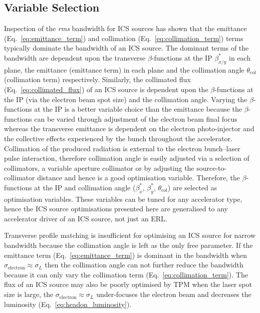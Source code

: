 \documentclass[../main.tex]{subfiles}
\begin{document}
\subsection{Variable Selection}
\label{sec:variable_selection}

Inspection of the \textit{rms} bandwidth for ICS sources has shown that the emittance (Eq.~\ref{eq:emittance_term}) and collimation (Eq.~\ref{eq:collimation_term}) terms typically dominate the bandwidth of an ICS source. The dominant terms of the bandwidth are dependent upon the transverse $\beta$-functions at the IP $\beta^{*}_{x/y}$ in each plane, the emittance (emittance term) in each plane and the collimation angle $\theta_{\mathrm{col}}$ (collimation term) respectively. Similarly, the collimated flux (Eq.~\ref{eq:collimated_flux}) of an ICS source is dependent upon the $\beta$-functions at the IP (via the electron beam spot size) and the collimation angle. Varying the $\beta$-functions at the IP is a better variable choice than the emittance because the $\beta$-functions can be varied through adjustment of the electron beam final focus whereas the transverse emittance is dependent on the electron photo-injector and the collective effects experienced by the bunch throughout the accelerator. Collimation of the produced radiation is external to the electron bunch--laser pulse interaction, therefore collimation angle is easily adjusted via a selection of collimators, a variable aperture collimator or by adjusting the source-to-collimator distance and hence is a good optimisation variable. Therefore, the $\beta$-functions at the IP and collimation angle ($\beta^{*}_{x}$, $\beta^{*}_{y}$, $\theta_{\mathrm{col}}$) are selected as optimisation variables. These variables can be tuned for any accelerator type, hence the ICS source optimisations presented here are generalised to any accelerator driver of an ICS source, not just an ERL.

Transverse profile matching is insufficient for optimising an ICS source for narrow bandwidth because the collimation angle is left as the only free parameter. If the emittance term (Eq.~\ref{eq:emittance_term}) is dominant in the bandwidth when $\sigma_{\mathrm{electron}} \approx \sigma_{L}$ then the collimation angle can not further reduce the bandwidth because it can only vary the collimation term (Eq.~\ref{eq:collimation_term}). The flux of an ICS source may also be poorly optimised by TPM when the laser spot size is large, the $\sigma_{\mathrm{electron}} \approx \sigma_{L}$ under-focuses the electron beam and decreases the luminosity (Eq.~\ref{eq:headon_luminosity}).
\end{document}

